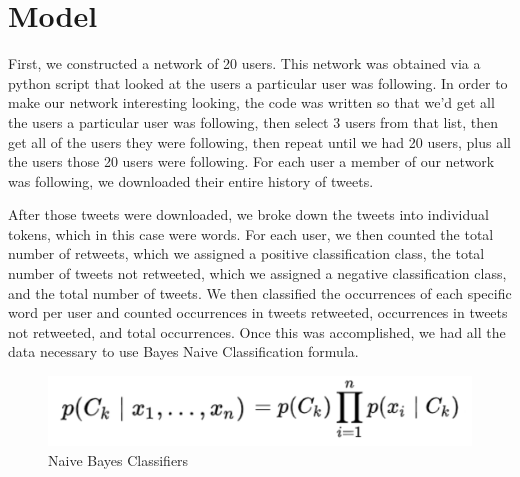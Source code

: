 \documentclass{article}
\begin{document}
\section{Model}

First, we constructed a network of 20 users. This network was obtained via a python script that looked at the users a particular user was following. In order to make our network interesting looking, the code was written so that we'd get all the users a particular user was following, then select 3 users from that list, then get all of the users they were following, then repeat until we had 20 users, plus all the users those 20 users were following. For each user a member of our network was following, we downloaded their entire history of tweets.

After those tweets were downloaded, we broke down the tweets into individual tokens, which in this case were words. For each user, we then counted the total number of retweets, which we assigned a positive classification class, the total number of tweets not retweeted, which we assigned a negative classification class, and the total number of tweets. We then classified the occurrences of each specific word per user and counted occurrences in tweets retweeted, occurrences in tweets not retweeted, and total occurrences. Once this was accomplished, we had all the data necessary to use Bayes Naive Classification formula.

\begin{figure}
  \includegraphics[width=\linewidth]{equation.png}
  \caption{Naive Bayes Classifiers}
  \label{fig:boat1}
\end{figure}
\end{document}
